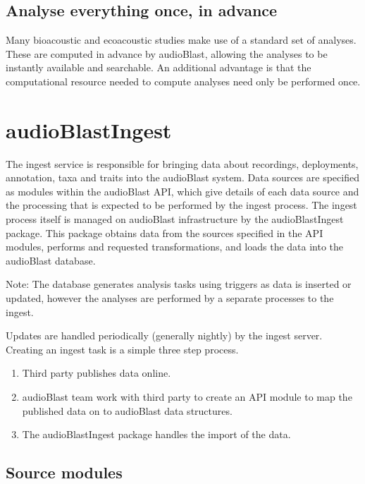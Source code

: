\documentclass[
]{book}
\begin{document}
\hypertarget{analyse-everything-once-in-advance}{%
\section{Analyse everything once, in advance}\label{analyse-everything-once-in-advance}}

Many bioacoustic and ecoacoustic studies make use of a standard set of analyses. These are computed in advance by audioBlast, allowing the analyses to be instantly available and searchable. An additional advantage is that the computational resource needed to compute analyses need only be performed once.

\hypertarget{audioblastingest}{%
\chapter{audioBlastIngest}\label{audioblastingest}}

The ingest service is responsible for bringing data about recordings, deployments, annotation, taxa and traits into the audioBlast system. Data sources are specified as modules within the audioBlast API, which give details of each data source and the processing that is expected to be performed by the ingest process. The ingest process itself is managed on audioBlast infrastructure by the audioBlastIngest package. This package obtains data from the sources specified in the API modules, performs and requested transformations, and loads the data into the audioBlast database.

Note: The database generates analysis tasks using triggers as data is inserted or updated, however the analyses are performed by a separate processes to the ingest.

Updates are handled periodically (generally nightly) by the ingest server. Creating an ingest task is a simple three step process.

\begin{enumerate}
\def\labelenumi{\arabic{enumi}.}
\item
  Third party publishes data online.
\item
  audioBlast team work with third party to create an API module to map the published data on to audioBlast data structures.
\item
  The audioBlastIngest package handles the import of the data.
\end{enumerate}

\hypertarget{source-modules}{%
\section{Source modules}\label{source-modules}}
\end{document}

